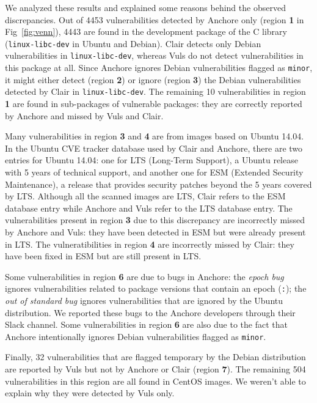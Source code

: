 \documentclass[a4paper,num-refs]{oup-contemporary}
\begin{document}
We analyzed these results and explained some reasons behind the observed
discrepancies. Out of 4453 vulnerabilities detected by Anchore only (region
\textbf{1} in Fig~\ref{fig:venn}), 4443 are found in the development
package of the C library (\texttt{linux-libc-dev} in Ubuntu and Debian).
Clair detects only Debian vulnerabilities in \texttt{linux-libc-dev},
whereas Vuls do not detect vulnerabilities in this package at all. Since Anchore
ignores Debian
vulnerabilities flagged as \texttt{minor}, it
might either detect (region \textbf{2}) or ignore (region \textbf{3})
the
Debian vulnerabilities detected by Clair in \texttt{linux-libc-dev}. The
remaining 10 vulnerabilities in region \textbf{1} are found in sub-packages
of vulnerable packages: they are correctly reported by Anchore and missed
by Vuls and Clair. 

Many vulnerabilities in region \textbf{3} and \textbf{4} are from images
based on Ubuntu 14.04. In the Ubuntu CVE tracker database used by Clair and
Anchore, there are two entries for Ubuntu 14.04: one for LTS (Long-Term
Support), a Ubuntu release with 5 years of technical support, and another one
for ESM (Extended Security Maintenance), a release that provides security
patches beyond the 5 years covered by LTS. Although all the scanned images
are LTS, Clair refers to the ESM database entry while Anchore and Vuls refer to the
LTS database entry. The vulnerabilities present in region \textbf{3} due to
this discrepancy are incorrectly missed by Anchore and Vuls: they have been
detected in ESM but were already present in LTS. The vulneratibilities in
region \textbf{4} are incorrectly missed by Clair: they have been fixed in
ESM but are still present in LTS. 

Some vulnerabilities in region \textbf{6} are due to bugs in Anchore: the
\textit{epoch bug} ignores vulnerabilities related to package versions that
contain an epoch (\texttt{:}); the \textit{out of standard bug} ignores
vulnerabilities that are ignored by the Ubuntu distribution. We reported
these bugs to the Anchore developers through their Slack channel. Some
vulnerabilities in region \textbf{6} are also due to the fact that Anchore
intentionally ignores Debian vulnerabilities flagged as \texttt{minor}.

Finally, 32 vulnerabilities that are flagged temporary by the Debian
distribution are reported by Vuls but not by Anchore or Clair (region
\textbf{7}). The remaining 504 vulnerabilities in this region are all found
in CentOS images. We weren't able to explain why they were detected by Vuls
only.
\end{document}
